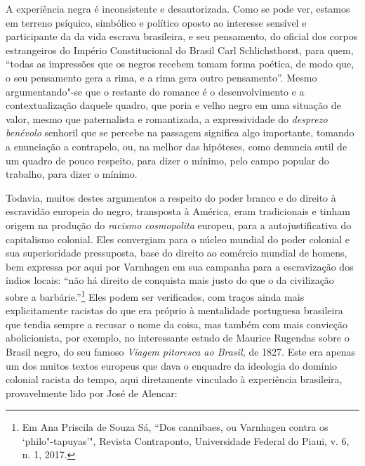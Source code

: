 A experiência negra é inconsistente e desautorizada. Como se pode ver,
estamos em terreno psíquico, simbólico e político oposto ao interesse
sensível e participante da da vida escrava brasileira, e seu pensamento,
do oficial dos corpos estrangeiros do Império Constitucional do Brasil
Carl Schlichsthorst, para quem, ``todas as impressões que os negros
recebem tomam forma poética, de modo que, o seu pensamento gera a rima,
e a rima gera outro pensamento''. Mesmo argumentando"-se que o restante
do romance é o desenvolvimento e a contextualização daquele quadro, que
poria e velho negro em uma situação de valor, mesmo que paternalista e
romantizada, a expressividade do \emph{desprezo benévolo} senhoril que
se percebe na passagem significa algo importante, tomando a enunciação a
contrapelo, ou, na melhor das hipóteses, como denuncia sutil de um
quadro de pouco respeito, para dizer o mínimo, pelo campo popular do
trabalho, para dizer o mínimo.

Todavia, muitos destes argumentos a respeito do poder branco e do
direito à escravidão europeia do negro, transposta à América, eram
tradicionais e tinham origem na produção do \emph{racismo cosmopolita}
europeu, para a autojustificativa do capitalismo colonial. Eles
convergiam para o núcleo mundial do poder colonial e sua superioridade
pressuposta, base do direito ao comércio mundial de homens, bem expressa
por aqui por Varnhagen em sua campanha para a escravização dos índios
locais: ``não há direito de conquista mais justo do que o da civilização
sobre a barbárie.''\footnote{Em Ana Priscila de Souza Sá, ``Dos
  cannibaes, ou Varnhagen contra os `philo"-tapuyas'", Revista
  Contraponto, Universidade Federal do Piaui, v. 6, n. 1, 2017.} Eles
podem ser verificados, com traços ainda mais explicitamente racistas do
que era próprio à mentalidade portuguesa brasileira que tendia sempre a
recusar o nome da coisa, mas também com mais convicção abolicionista,
por exemplo, no interessante estudo de Maurice Rugendas sobre o Brasil
negro, do seu famoso \emph{Viagem pitoresca ao Brasil,} de 1827. Este
era apenas um dos muitos textos europeus que dava o enquadre da
ideologia do domínio colonial racista do tempo, aqui diretamente
vinculado à experiência brasileira, provavelmente lido por José de
Alencar:

